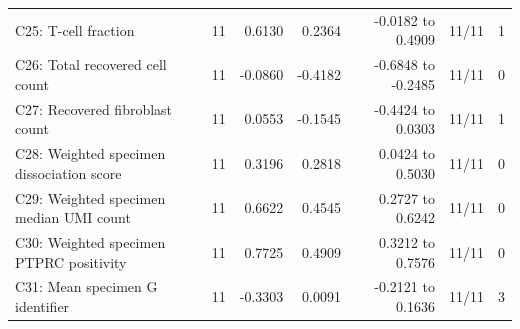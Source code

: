 {\begin{longtable}{@{}p{.29\linewidth}rrrrrr@{}}
C25: T-cell fraction & 11 & 0.6130 & 0.2364 & -0.0182 to 0.4909 & 11/11 & 1 \\
C26: Total recovered cell count & 11 & -0.0860 & -0.4182 & -0.6848 to -0.2485 & 11/11 & 0 \\
C27: Recovered fibroblast count & 11 & 0.0553 & -0.1545 & -0.4424 to 0.0303 & 11/11 & 1 \\
C28: Weighted specimen dissociation score & 11 & 0.3196 & 0.2818 & 0.0424 to 0.5030 & 11/11 & 0 \\
C29: Weighted specimen median UMI count & 11 & 0.6622 & 0.4545 & 0.2727 to 0.6242 & 11/11 & 0 \\
C30: Weighted specimen PTPRC positivity & 11 & 0.7725 & 0.4909 & 0.3212 to 0.7576 & 11/11 & 0 \\
C31: Mean specimen G identifier & 11 & -0.3303 & 0.0091 & -0.2121 to 0.1636 & 11/11 & 3 \\
\end{longtable}
}

